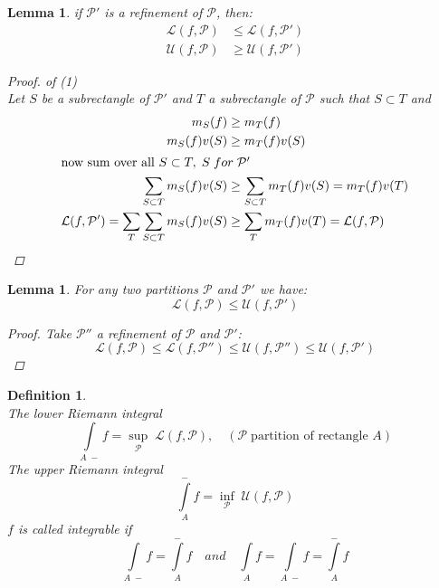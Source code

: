 \documentclass[11pt]{article}
\newtheorem{lemma}[theorem]{Lemma}
\newtheorem{definition}{Definition}[section]
\begin{document}
\begin{lemma}
if $\mathcal{P}'$ is a refinement of $\mathcal{P}$, then:
\begin{align}
\mathcal{L}(f,\mathcal{P}) &\leq \mathcal{L}(f,\mathcal{P}')\\
\mathcal{U}(f,\mathcal{P}) &\geq \mathcal{U}(f,\mathcal{P}') 
\end{align}

\begin{proof} of (1)\\
Let $S$ be a subrectangle of $\mathcal{P}'$ and $T$ a subrectangle of $\mathcal{P}$ such that $S\subset T$ and
\begin{align*}
m_S(f) & \geq m_T(f) \\
m_S(f)v(S) &\geq m_T(f)v(S) \qquad \\
\intertext{now sum over all $S \subset T, \; S \; for \; \mathcal{P}'$}
\sum_{S \subset T}m_S(f)v(S) &\geq \sum_{S \subset T}m_T(f)v(S) = m_T(f)v(T)\\
\mathcal{L}(f,\mathcal{P}') = \sum_{T}\sum_{S \subset T}m_S(f)v(S) &\geq \sum_{T} m_T(f)v(T) = \mathcal{L}(f,\mathcal{P})\\
\end{align*}
\end{proof}
\end{lemma}

\begin{lemma}
For any two partitions $\mathcal{P}$ and $\mathcal{P}'$ we have:
 \[\mathcal{L}(f,\mathcal{P}) \leq \mathcal{U}(f,\mathcal{P}')\]
\begin{proof}
Take $\mathcal{P}''$ a refinement of $\mathcal{P}$ and $\mathcal{P}'$:
\[\mathcal{L}(f,\mathcal{P}) \leq\mathcal{L}(f,\mathcal{P}'') \leq \mathcal{U}(f,\mathcal{P}'') \leq  \mathcal{U}(f,\mathcal{P}')\]
\end{proof}
\end{lemma}

\begin{definition} \quad \\
The lower Riemann integral \[\int\limits_{A \;-}f = \sup_{\mathcal{P}} \;\mathcal{L}(f, \mathcal{P}) , \quad (\mathcal{P}\; \text{partition of rectangle $A$})\]
The upper Riemann integral \[\int\limits_{A}^{-}f = \inf_{\mathcal{P}} \;\mathcal{U}(f, \mathcal{P})\]
$f$ is called integrable if 
\[ \int\limits_{A\;-}f = \int\limits_{A}^{-}f \quad and \quad \int\limits_{A} f = \int\limits_{A \;-}f = \int\limits_{A}^{-}f\] 
\end{definition}
\end{document}
